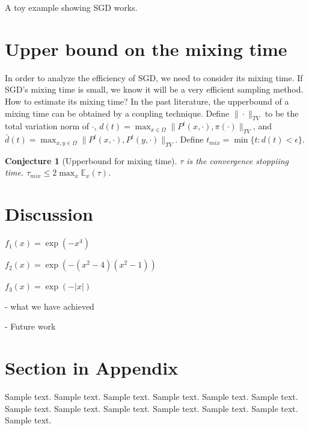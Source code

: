 \documentclass[preprint,12pt,3p]{elsarticle}
\newcommand{\E}{\mathbb{E}}
\newtheorem{conjecture}{Conjecture}
\begin{document}
A toy example showing SGD works.
\section{Upper bound on the mixing time} %
\label{sec:upper_bound_on_the_mixing_time}
In order to analyze the efficiency of SGD, we need to consider its mixing time. If SGD's mixing time is small, we know it will be a very efficient sampling method. How to estimate its mixing time? In the past literature, the upperbound of a mixing time can be obtained by a coupling technique. Define $\|\cdot\|_{TV}$ to be the total variation norm of $\cdot$, $d(t) = \max_{x\in \Omega} \|P^t(x, \cdot), \pi(\cdot)\|_{TV}$, and $\bar{d}(t) = \max_{x,y\in \Omega} \|P^t(x, \cdot), P^t(y,\cdot)\|_{TV}$. Define $t_{mix} = \min\{t:d(t) < \epsilon\}$.
\begin{conjecture}[Upperbound for mixing time] $\tau$ is the convergence stoppiing time. $\tau_{mix} \leq 2 \max_{x} \E_{x}(\tau)$.
\end{conjecture}

\section{Discussion} %
\label{sec:discussion}



$f_1(x) = \exp(-x^4)$

$f_2(x) = \exp(-(x^2 - 4)(x^2 - 1))$

$f_3(x) = \exp(-|x|)$





- what we have achieved

- Future work

\newpage
\appendix

\section{Section in Appendix}
\label{appendix-sec1}

Sample text. Sample text. Sample text. Sample text. Sample text. Sample text.
Sample text. Sample text. Sample text. Sample text. Sample text. Sample text.
Sample text.
\end{document}
